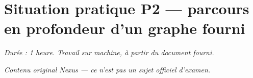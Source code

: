 %
\section*{Situation pratique P2 --- parcours en profondeur d'un graphe fourni}

\textit{Durée : 1 heure. Travail sur machine, à partir du document fourni.}

\medskip
\textit{Contenu original Nexus --- ce n'est pas un sujet officiel d'examen.}

